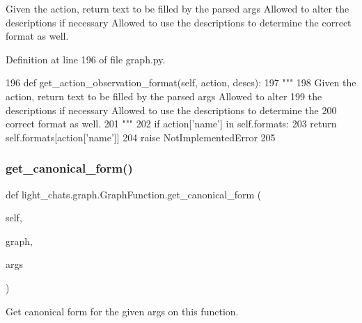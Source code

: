 \begin{DoxyVerb}Given the action, return text to be filled by the parsed args Allowed to alter
the descriptions if necessary Allowed to use the descriptions to determine the
correct format as well.
\end{DoxyVerb}
 

Definition at line 196 of file graph.\+py.


\begin{DoxyCode}
196     \textcolor{keyword}{def }get\_action\_observation\_format(self, action, descs):
197         \textcolor{stringliteral}{"""}
198 \textcolor{stringliteral}{        Given the action, return text to be filled by the parsed args Allowed to alter}
199 \textcolor{stringliteral}{        the descriptions if necessary Allowed to use the descriptions to determine the}
200 \textcolor{stringliteral}{        correct format as well.}
201 \textcolor{stringliteral}{        """}
202         \textcolor{keywordflow}{if} action[\textcolor{stringliteral}{'name'}] \textcolor{keywordflow}{in} self.formats:
203             \textcolor{keywordflow}{return} self.formats[action[\textcolor{stringliteral}{'name'}]]
204         \textcolor{keywordflow}{raise} NotImplementedError
205 
\end{DoxyCode}
\mbox{\label{classlight__chats_1_1graph_1_1GraphFunction_a0994341bec72be122101ce59da936882}} 
\subsubsection{\texorpdfstring{get\+\_\+canonical\+\_\+form()}{get\_canonical\_form()}}
{\footnotesize\ttfamily def light\+\_\+chats.\+graph.\+Graph\+Function.\+get\+\_\+canonical\+\_\+form (\begin{DoxyParamCaption}\item[{}]{self,  }\item[{}]{graph,  }\item[{}]{args }\end{DoxyParamCaption})}

\begin{DoxyVerb}Get canonical form for the given args on this function.
\end{DoxyVerb}
 

